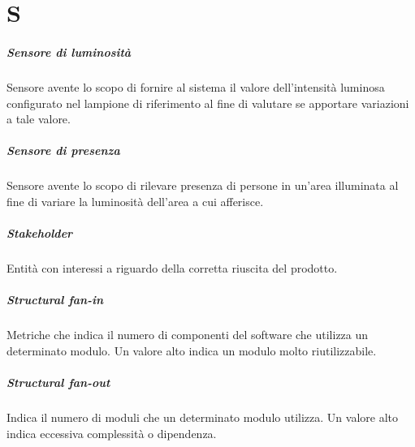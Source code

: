 \chapter{S}

\paragraph*{Sensore di luminosità}
Sensore avente lo scopo di fornire al sistema il valore dell'intensità luminosa configurato nel lampione di riferimento al fine di valutare se apportare variazioni a tale valore.

\paragraph*{Sensore di presenza}
Sensore avente lo scopo di rilevare presenza di persone in un'area illuminata al fine di variare la luminosità dell'area a cui afferisce.

\paragraph*{Stakeholder}
Entità con interessi a riguardo della corretta riuscita del prodotto.

\paragraph*{Structural fan-in}
Metriche che indica il numero di componenti del software che utilizza un determinato modulo. Un valore alto indica un modulo molto riutilizzabile.

\paragraph*{Structural fan-out}
Indica il numero di moduli che un determinato modulo utilizza. Un valore alto indica eccessiva complessità o dipendenza.